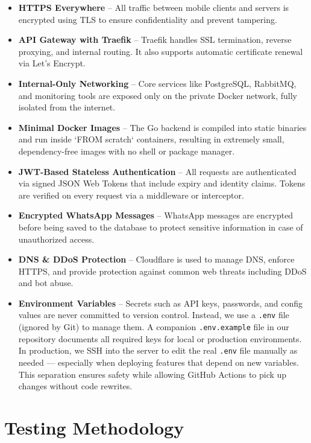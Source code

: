 \begin{itemize}
    \item \textbf{HTTPS Everywhere} – All traffic between mobile clients and servers is encrypted using TLS to ensure confidentiality and prevent tampering.
    \item \textbf{API Gateway with Traefik} – Traefik handles SSL termination, reverse proxying, and internal routing. It also supports automatic certificate renewal via Let's Encrypt.
    \item \textbf{Internal-Only Networking} – Core services like PostgreSQL, RabbitMQ, and monitoring tools are exposed only on the private Docker network, fully isolated from the internet.
    \item \textbf{Minimal Docker Images} – The Go backend is compiled into static binaries and run inside `FROM scratch` containers, resulting in extremely small, dependency-free images with no shell or package manager.
    \item \textbf{JWT-Based Stateless Authentication} – All requests are authenticated via signed JSON Web Tokens that include expiry and identity claims. Tokens are verified on every request via a middleware or interceptor.
    \item \textbf{Encrypted WhatsApp Messages} – WhatsApp messages are encrypted before being saved to the database to protect sensitive information in case of unauthorized access.
    \item \textbf{DNS \& DDoS Protection} – Cloudflare is used to manage DNS, enforce HTTPS, and provide protection against common web threats including DDoS and bot abuse.
    \item \textbf{Environment Variables} – Secrets such as API keys, passwords, and config values are never committed to version control. Instead, we use a \texttt{.env} file (ignored by Git) to manage them. A companion \texttt{.env.example} file in our repository documents all required keys for local or production environments. In production, we SSH into the server to edit the real \texttt{.env} file manually as needed — especially when deploying features that depend on new variables. This separation ensures safety while allowing GitHub Actions to pick up changes without code rewrites.

\end{itemize}

\section{Testing Methodology}

